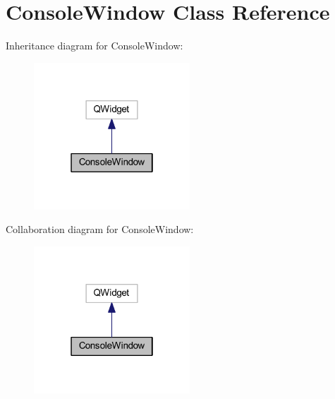 \hypertarget{class_console_window}{\section{Console\-Window Class Reference}
\label{class_console_window}
}


Inheritance diagram for Console\-Window\-:\nopagebreak
\begin{figure}[H]
\begin{center}
\leavevmode
\includegraphics[width=166pt]{class_console_window__inherit__graph}
\end{center}
\end{figure}


Collaboration diagram for Console\-Window\-:\nopagebreak
\begin{figure}[H]
\begin{center}
\leavevmode
\includegraphics[width=166pt]{class_console_window__coll__graph}
\end{center}
\end{figure}
